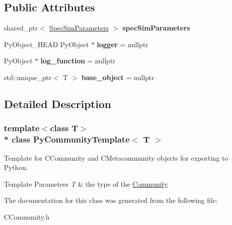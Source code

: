 \subsection*{Public Attributes}
\begin{DoxyCompactItemize}
\item 
shared\+\_\+ptr$<$ \hyperlink{struct_spec_sim_parameters}{Spec\+Sim\+Parameters} $>$ {\bfseries spec\+Sim\+Parameters}\hypertarget{class_py_community_template_acf9ef7d5d3e64724e895bc0ab08e9660}{}\label{class_py_community_template_acf9ef7d5d3e64724e895bc0ab08e9660}

\item 
Py\+Object\+\_\+\+H\+E\+AD Py\+Object $\ast$ {\bfseries logger} = nullptr\hypertarget{class_py_template_a5b741a472639d65f9bcad29afa16ec99}{}\label{class_py_template_a5b741a472639d65f9bcad29afa16ec99}

\item 
Py\+Object $\ast$ {\bfseries log\+\_\+function} = nullptr\hypertarget{class_py_template_a98bb8152faa73d028342d5cf260f0372}{}\label{class_py_template_a98bb8152faa73d028342d5cf260f0372}

\item 
std\+::unique\+\_\+ptr$<$ T $>$ {\bfseries base\+\_\+object} = nullptr\hypertarget{class_py_template_abcd20aea11103e6764f38cf5ed4085ca}{}\label{class_py_template_abcd20aea11103e6764f38cf5ed4085ca}

\end{DoxyCompactItemize}


\subsection{Detailed Description}
\subsubsection*{template$<$class T$>$\\*
class Py\+Community\+Template$<$ T $>$}

Template for C\+Community and C\+Metacommunity objects for exporting to Python. 


\begin{DoxyTemplParams}{Template Parameters}
{\em T} & the type of the \hyperlink{class_community}{Community} \\
\hline
\end{DoxyTemplParams}


The documentation for this class was generated from the following file\+:\begin{DoxyCompactItemize}
\item 
C\+Community.\+h\end{DoxyCompactItemize}

